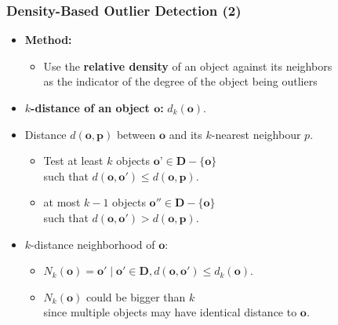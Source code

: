 \begin{frame}
  \frametitle{Density-Based Outlier Detection (2)}
  \begin{itemize}
  \item \textbf{Method:}
    \begin{itemize}
    \item Use the \textbf{relative density} of an object against its neighbors \\
      as the indicator of the degree of the object being outliers
    \end{itemize}
  \item \textbf{{\color{airforceblue}$k$-distance} of an object $\mathbf{o}$:} $d_k(\mathbf{o})$.
  \item Distance $d(\mathbf{o}, \mathbf{p})$ between $\mathbf{o}$ and its $k$-nearest neighbour $p$.
    \begin{itemize}
    \item Test at least $k$ objects $\textbf{o'} \in \mathbf{D} - \{\mathbf{o}\}$ \\
      such that $d(\mathbf{o}, \mathbf{o'}) \leq d(\mathbf{o}, \mathbf{p})$.
    \item at most $k-1$ objects $\mathbf{o''} \in \mathbf{D} - \{\mathbf{o}\}$ \\
      such that $d(\mathbf{o}, \mathbf{o'}) > d(\mathbf{o}, \mathbf{p})$.
    \end{itemize}
  \item $k$-distance neighborhood of $\mathbf{o}$:
    \begin{itemize}
    \item $N_k(\mathbf{o}) = {\mathbf{o'} \; \vert \; \mathbf{o'} \in \mathbf{D}, d(\mathbf{o}, \mathbf{o'}) \leq d_k(\mathbf{o})}$.
    \item $N_k(\mathbf{o})$ could be bigger than $k$ \\
      since multiple objects may have identical distance to $\mathbf{o}$.
    \end{itemize}
  \end{itemize}
\end{frame}


